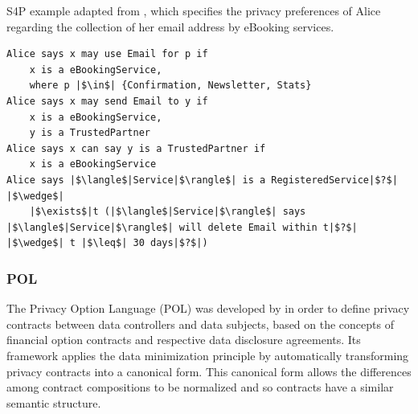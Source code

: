 \begin{listing}
\caption{S4P example adapted from \cite{becker_framework_2009}, which specifies the privacy preferences of Alice regarding the collection of her email address by eBooking services.}
\label{list:s4p_example}
\begin{verbatim}
Alice says x may use Email for p if
    x is a eBookingService,
    where p |$\in$| {Confirmation, Newsletter, Stats}
Alice says x may send Email to y if
    x is a eBookingService,
    y is a TrustedPartner
Alice says x can say y is a TrustedPartner if
    x is a eBookingService
Alice says |$\langle$|Service|$\rangle$| is a RegisteredService|$?$| |$\wedge$|
    |$\exists$|t (|$\langle$|Service|$\rangle$| says |$\langle$|Service|$\rangle$| will delete Email within t|$?$| |$\wedge$| t |$\leq$| 30 days|$?$|)
\end{verbatim}
\end{listing}

\subsubsection{POL}
\label{sec:pol}

The Privacy Option Language (POL) was developed by \cite{berthold_privacy_2013} in order to define privacy contracts between data controllers and data subjects, based on the concepts of financial option contracts and respective data disclosure agreements.
Its framework applies the data minimization principle by automatically transforming privacy contracts into a canonical form.
This canonical form allows the differences among contract compositions to be normalized and so contracts have a similar semantic structure.

